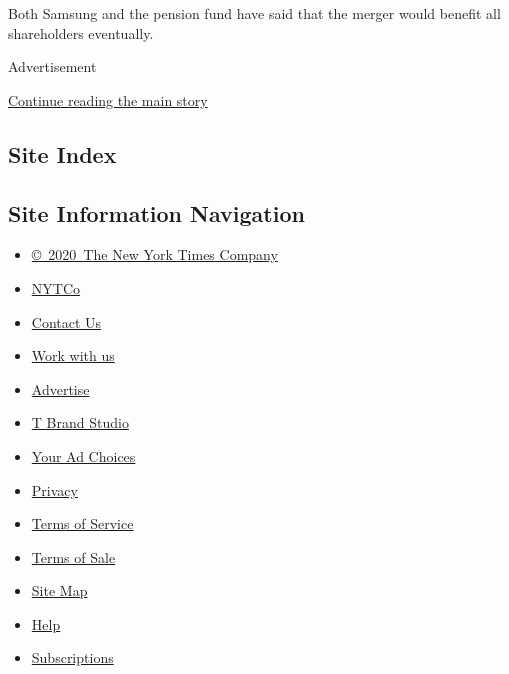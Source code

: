 Both Samsung and the pension fund have said that the merger would
benefit all shareholders eventually.

Advertisement

\protect\hyperlink{after-bottom}{Continue reading the main story}

\hypertarget{site-index}{%
\subsection{Site Index}\label{site-index}}

\hypertarget{site-information-navigation}{%
\subsection{Site Information
Navigation}\label{site-information-navigation}}

\begin{itemize}
\tightlist
\item
  \href{https://help.nytimes3xbfgragh.onion/hc/en-us/articles/115014792127-Copyright-notice}{©~2020~The
  New York Times Company}
\end{itemize}

\begin{itemize}
\tightlist
\item
  \href{https://www.nytco.com/}{NYTCo}
\item
  \href{https://help.nytimes3xbfgragh.onion/hc/en-us/articles/115015385887-Contact-Us}{Contact
  Us}
\item
  \href{https://www.nytco.com/careers/}{Work with us}
\item
  \href{https://nytmediakit.com/}{Advertise}
\item
  \href{http://www.tbrandstudio.com/}{T Brand Studio}
\item
  \href{https://www.nytimes3xbfgragh.onion/privacy/cookie-policy\#how-do-i-manage-trackers}{Your
  Ad Choices}
\item
  \href{https://www.nytimes3xbfgragh.onion/privacy}{Privacy}
\item
  \href{https://help.nytimes3xbfgragh.onion/hc/en-us/articles/115014893428-Terms-of-service}{Terms
  of Service}
\item
  \href{https://help.nytimes3xbfgragh.onion/hc/en-us/articles/115014893968-Terms-of-sale}{Terms
  of Sale}
\item
  \href{https://spiderbites.nytimes3xbfgragh.onion}{Site Map}
\item
  \href{https://help.nytimes3xbfgragh.onion/hc/en-us}{Help}
\item
  \href{https://www.nytimes3xbfgragh.onion/subscription?campaignId=37WXW}{Subscriptions}
\end{itemize}
